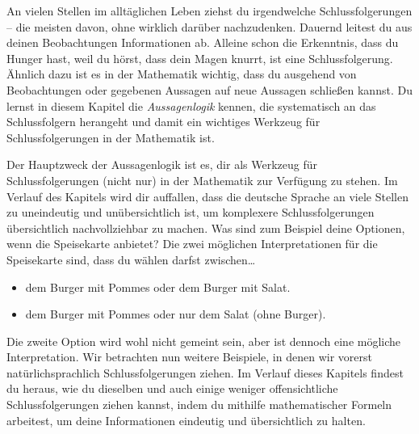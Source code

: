 \documentclass[../../main.tex]{subfiles}
\begin{document}

    An vielen Stellen im alltäglichen Leben ziehst du irgendwelche Schlussfolgerungen -- die meisten davon, ohne wirklich darüber nachzudenken. Dauernd leitest du aus deinen Beobachtungen Informationen ab. Alleine schon die Erkenntnis, dass du Hunger hast, weil du hörst, dass dein Magen knurrt, ist eine Schlussfolgerung. Ähnlich dazu ist es in der Mathematik wichtig, dass du ausgehend von Beobachtungen oder gegebenen Aussagen auf neue Aussagen schließen kannst. Du lernst in diesem Kapitel die \emph{Aussagenlogik} kennen, die systematisch an das Schlussfolgern herangeht und damit ein wichtiges Werkzeug für Schlussfolgerungen in der Mathematik ist.
    
    Der Hauptzweck der Aussagenlogik ist es, dir als Werkzeug für Schlussfolgerungen (nicht nur) in der Mathematik zur Verfügung zu stehen. Im Verlauf des Kapitels wird dir auffallen, dass die deutsche Sprache an viele Stellen zu uneindeutig und unübersichtlich ist, um komplexere Schlussfolgerungen übersichtlich nachvollziehbar zu machen. Was sind zum Beispiel deine Optionen, wenn die Speisekarte   anbietet? Die zwei möglichen Interpretationen für die Speisekarte sind, dass du wählen darfst zwischen\dots
    \begin{itemize}[label=\dots, nosep]
        \item dem Burger mit Pommes oder dem Burger mit Salat.
        \item dem Burger mit Pommes oder nur dem Salat (ohne Burger).
    \end{itemize}
    Die zweite Option wird wohl nicht gemeint sein, aber ist dennoch eine mögliche Interpretation. Wir betrachten nun weitere Beispiele, in denen wir vorerst natürlichsprachlich Schlussfolgerungen ziehen. Im Verlauf dieses Kapitels findest du heraus, wie du dieselben und auch einige weniger offensichtliche Schlussfolgerungen ziehen kannst, indem du mithilfe mathematischer Formeln arbeitest, um deine Informationen eindeutig und übersichtlich zu halten.
    
    
\end{document}
